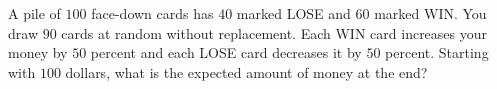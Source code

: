 A pile of $100$ face-down cards has $40$ marked LOSE and $60$ marked WIN. You draw $90$ cards at random without replacement. Each WIN card increases your money by $50$ percent and each LOSE card decreases it by $50$ percent. Starting with $100$ dollars, what is the expected amount of money at the end?
